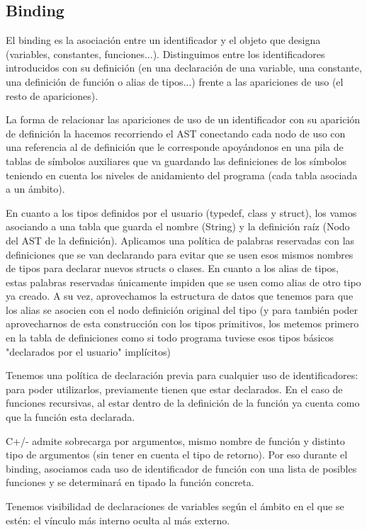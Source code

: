 \documentclass[10pt,a4paper]{article}
\begin{document}
\subsection{Binding}
\label{subsec:Binding}
El binding es la asociación entre un identificador y el objeto que designa (variables, constantes, funciones...). Distinguimos entre los identificadores introducidos con su definición (en una declaración de una variable, una constante, una definición de función o alias de tipos...) frente a las apariciones de uso (el resto de apariciones).


La forma de relacionar las apariciones de uso de un identificador con su aparición de definición la hacemos recorriendo el AST conectando cada nodo de uso con una referencia al de definición que le corresponde apoyándonos en una pila de tablas de símbolos auxiliares que va guardando las definiciones de los símbolos teniendo en cuenta los niveles de anidamiento del programa (cada tabla asociada a un ámbito).

En cuanto a los tipos definidos por el usuario (typedef, class y struct), los vamos asociando a una tabla que guarda el nombre (String) y la definición raíz (Nodo del AST de la definición). Aplicamos una política de palabras reservadas con las definiciones que se van declarando para evitar que se usen esos mismos nombres de tipos para declarar nuevos structs o clases. En cuanto a los alias de tipos, estas palabras reservadas únicamente impiden que se usen como alias de otro tipo ya creado. A su vez, aprovechamos la estructura de datos que tenemos para que los alias se asocien con el nodo definición original del tipo (y para también poder aprovecharnos de esta construcción con los tipos primitivos, los metemos primero en la tabla de definiciones como si todo programa tuviese esos tipos básicos "declarados por el usuario" implícitos)

Tenemos una política de declaración previa para cualquier uso de identificadores: para poder utilizarlos, previamente tienen que estar declarados. En el caso de funciones recursivas, al estar dentro de la definición de la función ya  cuenta como que la función esta declarada.

C+/- admite sobrecarga por argumentos, mismo nombre de función y distinto tipo de argumentos (sin tener en cuenta el tipo de retorno). Por eso durante el binding, asociamos cada uso de identificador de función con una lista de posibles funciones y se determinará en tipado la función concreta. 

Tenemos visibilidad de declaraciones de variables según el ámbito en el que se estén: el vínculo más interno oculta al más externo.
\end{document}

